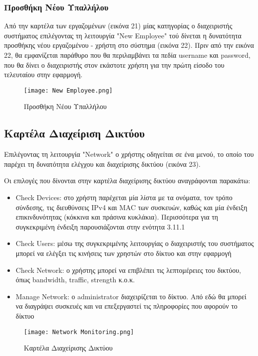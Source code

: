 \documentclass{article}
\begin{document}
\subsubsection{Προσθήκη Νέου Υπαλλήλου}

Από την καρτέλα των εργαζομένων (εικόνα 21) μίας κατηγορίας ο διαχειριστής συστήματος επιλέγοντας τη λειτουργία "New Employee" τού δίνεται η δυνατότητα προσθήκης νέου εργαζομένου - χρήστη στο σύστημα (εικόνα 22). Πριν από την εικόνα 22, θα εμφανίζεται παράθυρο που θα περιλαμβάνει τα πεδία username και password, που θα δίνει ο διαχειριστής στον εκάστοτε χρήστη για την πρώτη είσοδο του τελευταίου στην εφαρμογή. 


\newpage

\begin{figure}[!htb]
\centering
\texttt{[image: New Employee.png]} 
\caption{\label{fig: new employee} Προσθήκη Νέου Υπαλλήλου}
\end{figure}

\subsection{Καρτέλα Διαχείριση Δικτύου}

Επιλέγοντας τη λειτουργία "Network" ο χρήστης οδηγείται σε ένα μενού, το οποίο του παρέχει τη δυνατότητα ελέγχου και διαχείρισης δικτύου (εικόνα 23).

Οι επιλογές που δίνονται στην καρτέλα διαχείρισης δικτύου αναγράφονται παρακάτω:
\begin{itemize}
    \item Check Devices: στο χρήστη παρέχεται μία λίστα με τα ονόματα, τον τρόπο σύνδεσης, τις διευθύνσεις IPv4 και MAC των συσκευών, καθώς και μία ένδειξη επικινδυνότητας (κόκκινα και πράσινα κυκλάκια). Περισσότερα για τη συγκεκριμένη ένδειξη παρουσιάζονται στην ενότητα 3.11.1
    \item Check Users: μέσω της συγκεκριμένης λειτουργίας ο διαχειριστής του συστήματος μπορεί να ελέγξει τις κινήσεις των χρηστών στο δίκτυο και στην εφαρμογή
    \item Check Network: ο χρήστης μπορεί να επιβλέπει τις λεπτομέρειες του δικτύου, όπως bandwidth, traffic, strength κ.ο.κ.
    \item Manage Network: ο administrator διαχειρίζεται το δίκτυο. Από εδώ θα μπορεί να διαγράψει συσκευές και να επεξεργαστεί τις πληροφορίες που αφορούν το δίκτυο
\end{itemize}

\begin{figure}[!htb]
\centering
\texttt{[image: Network Monitoring.png]} 
\caption{\label{fig:netowrk monitoring} Καρτέλα Διαχείρισης Δικτύου }
\end{figure}
\end{document}
